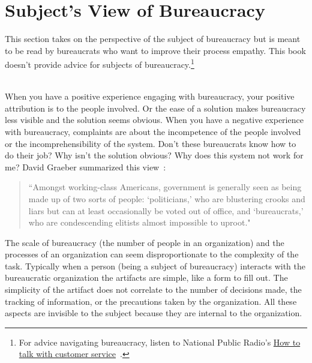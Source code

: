 \section{Subject's View of Bureaucracy\label{sec:subjects-view}}

This section takes on the perspective of the subject of bureaucracy but is meant to be read by bureaucrats who want to improve their \gls{process empathy}. This book doesn't provide advice for subjects of bureaucracy.\footnote{For advice navigating bureaucracy, listen to National Public Radio's \href{https://www.npr.org/2022/03/16/1086915600/get-what-you-want-customer-service}{How to talk with customer service}~\cite{2022_LifeKit}.} 

\ \\

When you have a positive experience engaging with bureaucracy, your positive attribution is to the people involved. Or the ease of a solution makes bureaucracy less visible and the solution seems obvious. 
When you have a negative experience with bureaucracy, complaints are about the incompetence of the people involved or the incomprehensibility of the system. Don't these bureaucrats know how to do their job? Why isn't the solution obvious? Why does this system not work for me? David Graeber summarized this view~\cite{2015_Graeber_regulation}:
\begin{quote}
 ``Amongst working-class Americans, government is generally seen as being made up of two sorts of people: `politicians,' who are blustering crooks and liars but can at least occasionally be voted out of office, and `bureaucrats,' who are condescending elitists almost impossible to uproot."
\end{quote}



The scale of bureaucracy (the number of people in an organization) and the processes of an organization can seem disproportionate to the complexity of the task. Typically when a person (being a subject of bureaucracy) interacts with the bureaucratic organization the artifacts are simple, like a form to fill out. The simplicity of the artifact does not correlate to the number of decisions made, the tracking of information, or the precautions taken by the organization. All these aspects are invisible to the subject because they are internal to the organization.

